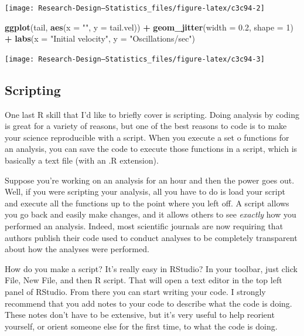 \documentclass[
]{book}
\newenvironment{Shaded}{\begin{snugshade}}{\end{snugshade}}
\newcommand{\AttributeTok}[1]{\textcolor[rgb]{0.13,0.29,0.53}{#1}}
\newcommand{\DecValTok}[1]{\textcolor[rgb]{0.00,0.00,0.81}{#1}}
\newcommand{\FloatTok}[1]{\textcolor[rgb]{0.00,0.00,0.81}{#1}}
\newcommand{\FunctionTok}[1]{\textcolor[rgb]{0.13,0.29,0.53}{\textbf{#1}}}
\newcommand{\NormalTok}[1]{#1}
\newcommand{\SpecialCharTok}[1]{\textcolor[rgb]{0.81,0.36,0.00}{\textbf{#1}}}
\newcommand{\StringTok}[1]{\textcolor[rgb]{0.31,0.60,0.02}{#1}}
\begin{document}
\begin{center}\texttt{[image: Research-Design---Statistics\_files/figure-latex/c3c94-2]} \end{center}

\begin{Shaded}
\begin{Highlighting}[]
\FunctionTok{ggplot}\NormalTok{(tail, }\FunctionTok{aes}\NormalTok{(}\AttributeTok{x =} \StringTok{""}\NormalTok{, }\AttributeTok{y =}\NormalTok{ tail.vel)) }\SpecialCharTok{+}
  \FunctionTok{geom\_jitter}\NormalTok{(}\AttributeTok{width =} \FloatTok{0.2}\NormalTok{, }\AttributeTok{shape =} \DecValTok{1}\NormalTok{) }\SpecialCharTok{+} 
  \FunctionTok{labs}\NormalTok{(}\AttributeTok{x =} \StringTok{"Initial velocity"}\NormalTok{, }\AttributeTok{y =} \StringTok{"Oscillations/sec"}\NormalTok{)}
\end{Highlighting}
\end{Shaded}

\begin{center}\texttt{[image: Research-Design---Statistics\_files/figure-latex/c3c94-3]} \end{center}

\subsection{Scripting}\label{scripting}

One last R skill that I'd like to briefly cover is scripting. Doing analysis by coding is great for a variety of reasons, but one of the best reasons to code is to make your science reproducible with a script. When you execute a set o functions for an analysis, you can save the code to execute those functions in a script, which is basically a text file (with an .R extension).

Suppose you're working on an analysis for an hour and then the power goes out. Well, if you were scripting your analysis, all you have to do is load your script and execute all the functions up to the point where you left off. A script allows you go back and easily make changes, and it allows others to see \emph{exactly} how you performed an analysis. Indeed, most scientific journals are now requiring that authors publish their code used to conduct analyses to be completely transparent about how the analyses were performed.

How do you make a script? It's really easy in RStudio? In your toolbar, just click File, New File, and then R script. That will open a text editor in the top left panel of RStudio. From there you can start writing your code. I strongly recommend that you add notes to your code to describe what the code is doing. These notes don't have to be extensive, but it's very useful to help reorient yourself, or orient someone else for the first time, to what the code is doing.
\end{document}

